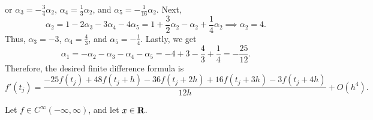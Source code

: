 \documentclass{homework}
\begin{document}
	or $\alpha_3 = -\frac{3}{4}\alpha_2$, $\alpha_4 = \frac{1}{3}\alpha_2$, and $\alpha_5 = -\frac{1}{16}\alpha_2$. Next,
	\begin{equation}
		\alpha_2 =1-2\alpha_3 -3\alpha_4-4\alpha_5 = 1 +\frac{3}{2}\alpha_2 -\alpha_2 + \frac{1}{4}\alpha_2 \implies \alpha_2 = 4.
	\end{equation}
	Thus, $\alpha_3 = -3$, $\alpha_4 = \frac{4}{3}$, and $\alpha_5 = -\frac{1}{4}$. Lastly, we get
	\begin{equation}
		\alpha_1 = -\alpha_2 -\alpha_3 -\alpha_4 - \alpha_5 = -4 +3-\frac{4}{3} + \frac{1}{4} = -\frac{25}{12}.
	\end{equation}
	Therefore, the desired finite difference formula is
	\begin{equation}
		f'(t_j) = \frac{-25f(t_j) + 48f(t_j + h) - 36f(t_j+2h) +16f(t_j+3h)-3f(t_j+4h)}{12h} + O(h^4).
	\end{equation}
	
	\question Let $f \in C^\infty(-\infty, \infty)$, and let $x \in\textbf{R}$.
	
\end{document}
